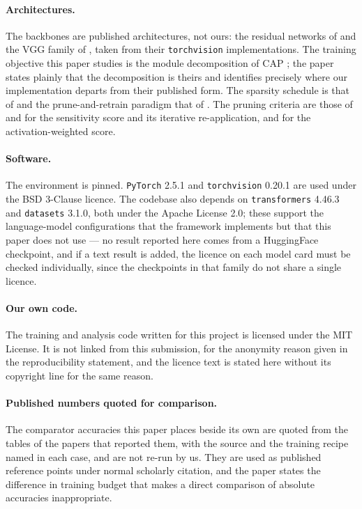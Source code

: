 \paragraph{Architectures.}
The backbones are published architectures, not ours: the residual networks of
\citet{he2016deep} and the VGG family of \citet{simonyan2015very}, taken from
their \texttt{torchvision} implementations. The training objective this paper
studies is the module decomposition of CAP \citep{xu2022cap}; the paper states
plainly that the decomposition is theirs and identifies precisely where our
implementation departs from their published form. The sparsity schedule is that
of \citet{zhu2018prune} and the prune-and-retrain paradigm that of
\citet{han2015learning}. The pruning criteria are those of \citet{lee2019snip}
and \citet{verdenius2020snipit} for the sensitivity score and its iterative
re-application, and \citet{sun2024wanda} for the activation-weighted score.

\paragraph{Software.}
The environment is pinned. \texttt{PyTorch} 2.5.1 and \texttt{torchvision}
0.20.1 are used under the BSD 3-Clause licence. The codebase also depends on
\texttt{transformers} 4.46.3 and \texttt{datasets} 3.1.0, both under the
Apache License 2.0; these support the language-model configurations that the
framework implements but that this paper does not use --- no result reported
here comes from a HuggingFace checkpoint, and if a text result is added, the
licence on each model card must be checked individually, since the checkpoints
in that family do not share a single licence.

\paragraph{Our own code.}
The training and analysis code written for this project is licensed under the
MIT License. It is not linked from this submission, for the anonymity reason
given in the reproducibility statement, and the licence text is stated here
without its copyright line for the same reason.

\paragraph{Published numbers quoted for comparison.}
The comparator accuracies this paper places beside its own are quoted from the
tables of the papers that reported them, with the source and the training recipe
named in each case, and are not re-run by us. They are used as published
reference points under normal scholarly citation, and the paper states the
difference in training budget that makes a direct comparison of absolute
accuracies inappropriate.
